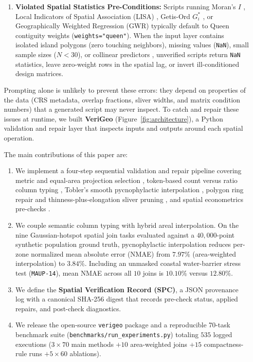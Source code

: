 \documentclass[10pt,twocolumn]{article}
\begin{document}
\begin{enumerate}
  \item \textbf{Violated Spatial Statistics Pre-Conditions:} Scripts running Moran's $I$ \cite{cliff1981spatial}, Local Indicators of Spatial Association (LISA) \cite{anselin1995local}, Getis-Ord $G_i^*$ \cite{getis1992analysis}, or Geographically Weighted Regression (GWR) \cite{brunsdon1996geographically} typically default to Queen contiguity weights (\texttt{weights="queen"}). When the input layer contains isolated island polygons (zero touching neighbors), missing values (\texttt{NaN}), small sample sizes ($N < 30$), or collinear predictors \cite{belsley1980regression,wheeler2005multicollinearity}, unverified scripts return \texttt{NaN} statistics, leave zero-weight rows in the spatial lag, or invert ill-conditioned design matrices.
\end{enumerate}

Prompting alone is unlikely to prevent these errors: they depend on properties of the data (CRS metadata, overlap fractions, sliver widths, and matrix condition numbers) that a generated script may never inspect. To catch and repair these issues at runtime, we built \textbf{VeriGeo} (Figure~\ref{fig:architecture}), a Python validation and repair layer that inspects inputs and outputs around each spatial operation.

The main contributions of this paper are:
\begin{enumerate}
  \item We implement a four-step sequential validation and repair pipeline covering metric and equal-area projection selection \cite{snyder1987map,savric2016projection}, token-based count versus ratio column typing \cite{kuhn2012core,scheider2020ontology}, Tobler's smooth pycnophylactic interpolation \cite{tobler1979smooth,tobler1970computer}, polygon ring repair and thinness-plus-elongation sliver pruning \cite{ledoux2014triangulation,polsby1991third}, and spatial econometrics pre-checks \cite{anselin1995local,belsley1980regression}.
  \item We couple semantic column typing with hybrid areal interpolation. On the nine Gaussian-hotspot spatial join tasks evaluated against a $40,000$-point synthetic population ground truth, pycnophylactic interpolation reduces per-zone normalized mean absolute error (NMAE) from $7.97\%$ (area-weighted interpolation) to $3.84\%$. Including an unmasked coastal water-barrier stress test (\texttt{MAUP-14}), mean NMAE across all $10$ joins is $10.10\%$ versus $12.80\%$.
  \item We define the \textbf{Spatial Verification Record (SPC)}, a JSON provenance log with a canonical SHA-256 digest that records pre-check status, applied repairs, and post-check diagnostics.
  \item We release the open-source \texttt{verigeo} package and a reproducible 70-task benchmark suite (\texttt{benchmarks/\allowbreak run\_experiments.py}) totaling $535$ logged executions ($3 \times 70$ main methods $+ 10$ area-weighted joins $+ 15$ compactness-rule runs $+ 5 \times 60$ ablations).
\end{enumerate}
\end{document}
